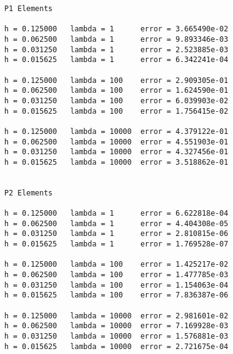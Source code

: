 \documentclass[a4paper,english,12pt,twoside]{article}
\begin{document}
\begin{lstlisting}[style=terminal, basicstyle=\small]
P1 Elements

h = 0.125000   lambda = 1      error = 3.665490e-02
h = 0.062500   lambda = 1      error = 9.893346e-03
h = 0.031250   lambda = 1      error = 2.523885e-03
h = 0.015625   lambda = 1      error = 6.342241e-04

h = 0.125000   lambda = 100    error = 2.909305e-01
h = 0.062500   lambda = 100    error = 1.624590e-01
h = 0.031250   lambda = 100    error = 6.039903e-02
h = 0.015625   lambda = 100    error = 1.756415e-02

h = 0.125000   lambda = 10000  error = 4.379122e-01
h = 0.062500   lambda = 10000  error = 4.551903e-01
h = 0.031250   lambda = 10000  error = 4.327456e-01
h = 0.015625   lambda = 10000  error = 3.518862e-01


P2 Elements

h = 0.125000   lambda = 1      error = 6.622818e-04
h = 0.062500   lambda = 1      error = 4.404308e-05
h = 0.031250   lambda = 1      error = 2.810815e-06
h = 0.015625   lambda = 1      error = 1.769528e-07

h = 0.125000   lambda = 100    error = 1.425217e-02
h = 0.062500   lambda = 100    error = 1.477785e-03
h = 0.031250   lambda = 100    error = 1.154063e-04
h = 0.015625   lambda = 100    error = 7.836387e-06

h = 0.125000   lambda = 10000  error = 2.981601e-02
h = 0.062500   lambda = 10000  error = 7.169928e-03
h = 0.031250   lambda = 10000  error = 1.576881e-03
h = 0.015625   lambda = 10000  error = 2.721675e-04
\end{lstlisting}
\end{document}

